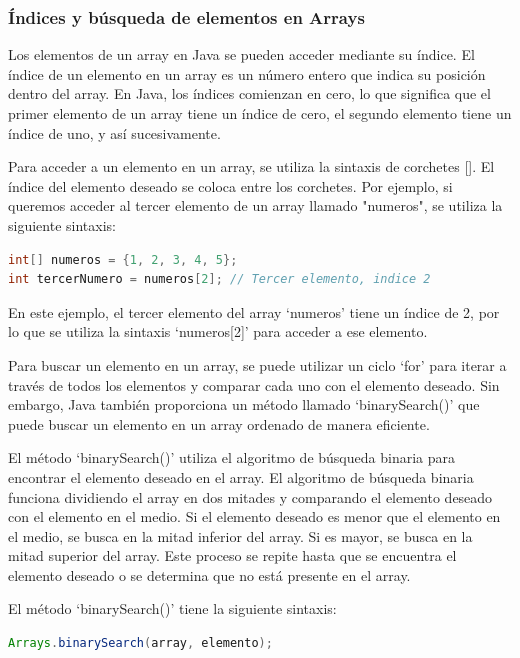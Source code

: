 \documentclass[executivepaper]{article}
\begin{document}
\subsubsection*{Índices y búsqueda de elementos en Arrays}

Los elementos de un array en Java se pueden acceder mediante su índice. El índice de un elemento en un array es un número entero que indica su posición dentro del array. En Java, los índices comienzan en cero, lo que significa que el primer elemento de un array tiene un índice de cero, el segundo elemento tiene un índice de uno, y así sucesivamente.

Para acceder a un elemento en un array, se utiliza la sintaxis de corchetes []. El índice del elemento deseado se coloca entre los corchetes. Por ejemplo, si queremos acceder al tercer elemento de un array llamado "numeros", se utiliza la siguiente sintaxis:

\begin{lstlisting}[language=Java]
int[] numeros = {1, 2, 3, 4, 5};
int tercerNumero = numeros[2]; // Tercer elemento, indice 2
\end{lstlisting}

En este ejemplo, el tercer elemento del array \enquote*{numeros} tiene un índice de 2, por lo que se utiliza la sintaxis \enquote*{numeros[2]} para acceder a ese elemento.

Para buscar un elemento en un array, se puede utilizar un ciclo \enquote*{for} para iterar a través de todos los elementos y comparar cada uno con el elemento deseado. Sin embargo, Java también proporciona un método llamado \enquote*{binarySearch()} que puede buscar un elemento en un array ordenado de manera eficiente.

El método \enquote*{binarySearch()} utiliza el algoritmo de búsqueda binaria para encontrar el elemento deseado en el array. El algoritmo de búsqueda binaria funciona dividiendo el array en dos mitades y comparando el elemento deseado con el elemento en el medio. Si el elemento deseado es menor que el elemento en el medio, se busca en la mitad inferior del array. Si es mayor, se busca en la mitad superior del array. Este proceso se repite hasta que se encuentra el elemento deseado o se determina que no está presente en el array.

El método \enquote*{binarySearch()} tiene la siguiente sintaxis:

\begin{lstlisting}[language=Java]
Arrays.binarySearch(array, elemento);
\end{lstlisting}
\end{document}
